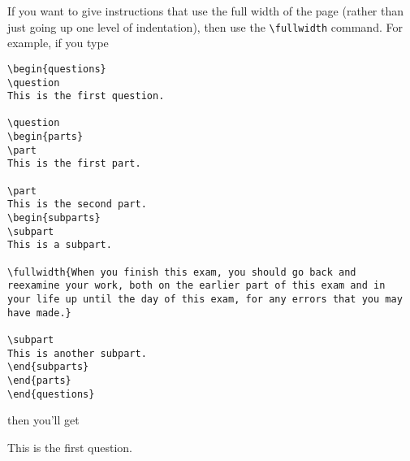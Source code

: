 \documentclass[12pt]{exam}
\begin{document}
\bigskip
If you want to give instructions that use the full width of the page
(rather than just going up one level of indentation), then use the
\verb"\fullwidth" command.  For example, if you type
%
\begin{verbatim}
\begin{questions}
\question
This is the first question.

\question
\begin{parts}
\part
This is the first part.

\part
This is the second part.
\begin{subparts}
\subpart
This is a subpart.

\fullwidth{When you finish this exam, you should go back and
reexamine your work, both on the earlier part of this exam and in
your life up until the day of this exam, for any errors that you may
have made.}

\subpart
This is another subpart.
\end{subparts}
\end{parts}
\end{questions}
\end{verbatim}
%
then you'll get
\begin{questions}
\question
This is the first question.

\question
{}
\end{questions}
\end{document}
